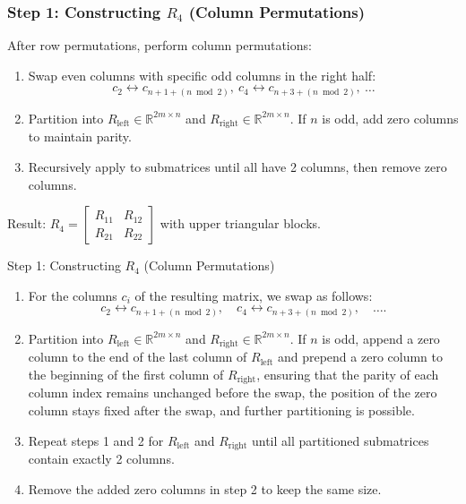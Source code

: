 \documentclass{beamer}
\begin{document}
\begin{frame}
    \frametitle{Step 1: Constructing \( R_4 \) (Column Permutations)}
    After row permutations, perform column permutations:
    \begin{enumerate}
        \item Swap even columns with specific odd columns in the right half:
        \[
        c_2 \leftrightarrow c_{n + 1 + (n \bmod 2)},\ c_4 \leftrightarrow c_{n + 3 + (n \bmod 2)},\ \dots
        \]
        \item Partition into \( R_{\text{left}} \in \mathbb{R}^{2m \times n} \) and \( R_{\text{right}} \in \mathbb{R}^{2m \times n} \). If \( n \) is odd, add zero columns to maintain parity.
        \item Recursively apply to submatrices until all have 2 columns, then remove zero columns.
    \end{enumerate}
    Result: \( R_4 = \begin{bmatrix} R_{11} & R_{12} \\ R_{21} & R_{22} \end{bmatrix} \) with upper triangular blocks.
\end{frame}

\begin{frame}{Step 1: Constructing \( R_4 \) (Column Permutations)}
    \begin{enumerate}
\item For the columns \( c_i \) of the resulting matrix, we swap as follows:  
   \begin{equation} \label{eq:cswap}
       c_2 \leftrightarrow c_{n + 1 + (n \bmod 2)}, \quad c_4 \leftrightarrow c_{n + 3 + (n \bmod 2)}, \quad \dots.
   \end{equation}  
\item  Partition into  \( R_{\text{left}} \in \mathbb{R}^{2m \times n} \)  and  \( R_{\text{right}} \in \mathbb{R}^{2m \times n} \). If \( n \) is odd, append a zero column to the end of the last column of \( R_{\text{left}} \) and prepend a zero column to the beginning of the first column of \( R_{\text{right}} \), ensuring that the parity of each column index remains unchanged before the swap, the position of the zero column stays fixed after the swap, and further partitioning is possible.  
 
\item  Repeat steps 1 and 2 for \( R_{\text{left}} \) and \( R_{\text{right}} \) until all partitioned submatrices contain exactly 2 columns. 
 
\item Remove the added zero columns in step 2 to keep the same size.
\end{enumerate}
\end{frame}
\end{document}
